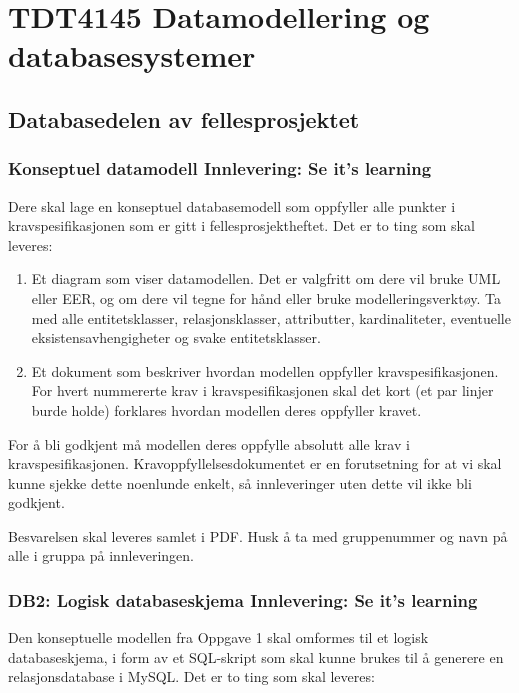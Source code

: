 \section{TDT4145 Datamodellering og databasesystemer}

\subsection{Databasedelen av fellesprosjektet}

\subsubsection{Konseptuel datamodell Innlevering: Se it's learning}

Dere skal lage en konseptuel databasemodell som oppfyller alle punkter i kravspesifikasjonen som er gitt i fellesprosjektheftet. Det er to ting som skal leveres: 

\begin{enumerate}

\item
Et diagram som viser datamodellen. Det er valgfritt om dere vil bruke UML eller EER, og om dere vil tegne for hånd eller bruke modelleringsverktøy. Ta med alle entitetsklasser, relasjonsklasser, attributter, kardinaliteter, eventuelle eksistensavhengigheter og svake entitetsklasser.

\item
Et dokument som beskriver hvordan modellen oppfyller kravspesifikasjonen. For hvert nummererte krav i kravspesifikasjonen skal det kort (et par linjer burde holde) forklares hvordan modellen deres oppfyller kravet.  

\end{enumerate}

For å bli godkjent må modellen deres oppfylle absolutt alle krav i kravspesifikasjonen. Kravoppfyllelsesdokumentet er en forutsetning for at vi skal kunne sjekke dette noenlunde enkelt, så innleveringer uten dette vil ikke bli godkjent. 

Besvarelsen skal leveres samlet i PDF. Husk å ta med gruppenummer og navn på alle i gruppa på innleveringen.

\subsubsection{DB2: Logisk databaseskjema Innlevering: Se it's learning}

Den konseptuelle modellen fra Oppgave 1 skal omformes til et logisk databaseskjema, i form av et SQL-skript som skal kunne brukes til å generere en relasjonsdatabase i MySQL. Det er to ting som skal leveres: 

